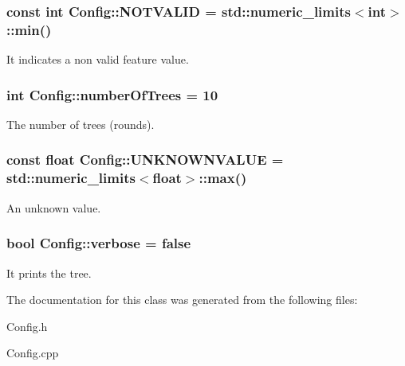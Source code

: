 \subsubsection[{N\+O\+T\+V\+A\+L\+I\+D}]{\setlength{\rightskip}{0pt plus 5cm}const int Config\+::\+N\+O\+T\+V\+A\+L\+I\+D = std\+::numeric\+\_\+limits$<$int$>$\+::min()\hspace{0.3cm}{\ttfamily [static]}}\label{class_config_a32d7d1aeb9a464a3f63a6b9b7f1806cf}
It indicates a non valid feature value. \hypertarget{class_config_a137fe8f8b08b54e78e5d7db29cabda1a}{}
\subsubsection[{number\+Of\+Trees}]{\setlength{\rightskip}{0pt plus 5cm}int Config\+::number\+Of\+Trees = 10\hspace{0.3cm}{\ttfamily [static]}}\label{class_config_a137fe8f8b08b54e78e5d7db29cabda1a}
The number of trees (rounds). \hypertarget{class_config_a249b25bbb5fd768cd74d66a6a4fbc71d}{}
\subsubsection[{U\+N\+K\+N\+O\+W\+N\+V\+A\+L\+U\+E}]{\setlength{\rightskip}{0pt plus 5cm}const float Config\+::\+U\+N\+K\+N\+O\+W\+N\+V\+A\+L\+U\+E = std\+::numeric\+\_\+limits$<$float$>$\+::max()\hspace{0.3cm}{\ttfamily [static]}}\label{class_config_a249b25bbb5fd768cd74d66a6a4fbc71d}
An unknown value. \hypertarget{class_config_a4b971d3db3a036f6c58fbb820f8a9d9a}{}
\subsubsection[{verbose}]{\setlength{\rightskip}{0pt plus 5cm}bool Config\+::verbose = false\hspace{0.3cm}{\ttfamily [static]}}\label{class_config_a4b971d3db3a036f6c58fbb820f8a9d9a}
It prints the tree. 

The documentation for this class was generated from the following files\+:\begin{DoxyCompactItemize}
\item 
Config.\+h\item 
Config.\+cpp\end{DoxyCompactItemize}
